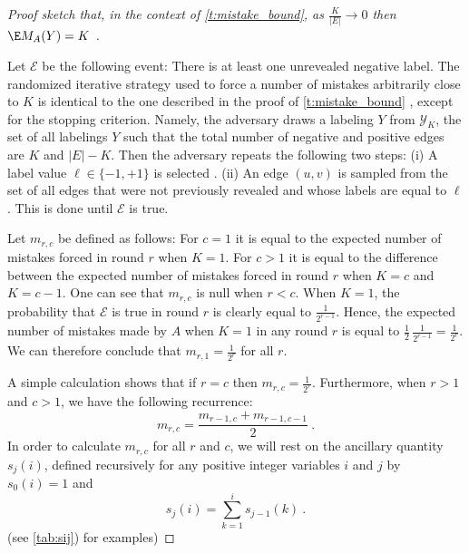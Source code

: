 \begin{proof}[Proof sketch that, in the context of \autoref{t:mistake_bound}, as $\frac{K}{|E|}
  \rightarrow 0$ then $\E M_A(Y)=K$  ]\label{proof:troll_K_mistakes}

Let $\mathcal{E}$ be the following event: There is at least one unrevealed negative label.
The randomized iterative strategy used to force a number of mistakes arbitrarily close to $K$ is identical to the one described
in the proof of \autoref{t:mistake_bound} , except for the stopping criterion.
Namely, the adversary draws a labeling $Y$ \uar{} from $\mathcal{Y}_K$, the set of all labelings $Y$
such that the total number of negative and positive edges are $K$ and $|E|-K$. Then the adversary
repeats the following two steps: (i) A label value $\ell\in\{-1,+1\}$ is selected \uar{}. (ii) An
edge $(u,v)$ is sampled \uar{} from the set of all edges that were not previously revealed and whose
labels are equal to $\ell$. This is done until $\mathcal{E}$ is true.

Let $m_{r,c}$ be defined as follows: For $c=1$ it is equal to the expected number of mistakes forced
in round $r$ when $K=1$. For $c > 1$ it is equal to the difference between the expected number of
mistakes forced in round $r$ when $K=c$ and $K=c-1$. One can see that $m_{r,c}$ is 
null when $r<c$. 
%
When $K=1$, the probability that $\mathcal{E}$ is true in round $r$ is clearly equal to
$\frac{1}{2^{r-1}}$.
Hence, the expected number of mistakes made by $A$ when $K=1$ in any round $r$ is equal to 
\(
\frac{1}{2}\,\frac{1}{2^{r-1}} = \frac{1}{2^{r}}.
\)
We can therefore conclude that $m_{r,1}=\frac{1}{2^{r}}$ for all $r$.

A simple calculation shows that if $r=c$ then $m_{r,c}=\frac{1}{2^r}$. Furthermore, when $r>1$ and $c>1$, 
we have the following recurrence:
\[
m_{r,c}=\frac{m_{r-1,c}+m_{r-1,c-1}}{2}~.
\]  
In order to calculate $m_{r,c}$ for all $r$ and $c$, we will rest on the ancillary quantity
$s_j(i)$, defined recursively for any positive integer variables $i$ and $j$ by
$ s_0(i)=1 $
and
\[
s_j(i)=\sum_{k=1}^i s_{j-1}(k)~.
\]
(see \autoref{tab:sij}) for examples)



\end{proof}
